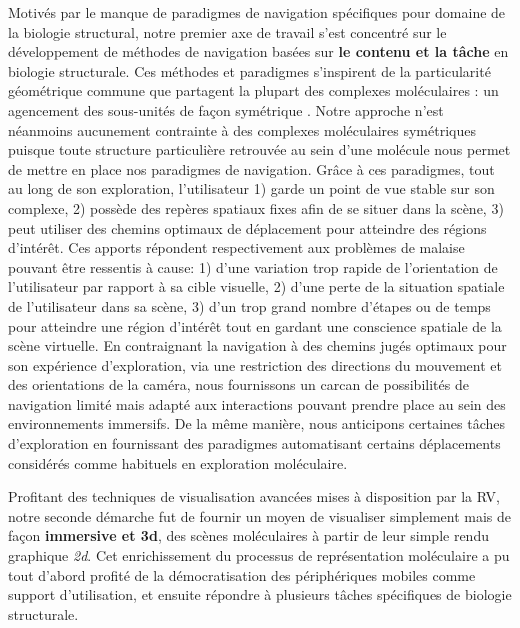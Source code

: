 Motivés par le manque de paradigmes de navigation spécifiques pour domaine de la biologie structural, notre premier axe de travail s'est concentré sur le développement de méthodes de navigation basées sur \textbf{le contenu et la tâche} en biologie structurale. Ces méthodes et paradigmes s'inspirent de la particularité géométrique commune que partagent la plupart des complexes moléculaires : un agencement des sous-unités de façon symétrique \cite{goodsell_structural_2000}. Notre approche n'est néanmoins aucunement contrainte à des complexes moléculaires symétriques puisque toute structure particulière retrouvée au sein d'une molécule nous permet de mettre en place nos paradigmes de navigation. Grâce à ces paradigmes, tout au long de son exploration, l'utilisateur 1) garde un point de vue stable sur son complexe, 2) possède des repères spatiaux fixes afin de se situer dans la scène, 3) peut utiliser des chemins optimaux de déplacement pour atteindre des régions d’intérêt. Ces apports répondent respectivement aux problèmes de malaise pouvant être ressentis à cause: 1) d'une variation trop rapide de l'orientation de l'utilisateur par rapport à sa cible visuelle, 2) d'une perte de la situation spatiale de l'utilisateur dans sa scène, 3) d'un trop grand nombre d'étapes ou de temps pour atteindre une région d'intérêt tout en gardant une conscience spatiale de la scène virtuelle. En contraignant la navigation à des chemins jugés optimaux pour son expérience d'exploration, via une restriction des directions du mouvement et des orientations de la caméra, nous fournissons un carcan de possibilités de navigation limité mais adapté aux interactions pouvant prendre place au sein des environnements immersifs. De la même manière, nous anticipons certaines tâches d'exploration en fournissant des paradigmes automatisant certains déplacements considérés comme habituels en exploration moléculaire.


Profitant des techniques de visualisation avancées mises à disposition par la RV, notre seconde démarche fut de fournir un moyen de visualiser simplement mais de façon \textbf{immersive et 3d}, des scènes moléculaires à partir de leur simple rendu graphique \textit{2d}. Cet enrichissement du processus de représentation moléculaire a pu tout d'abord profité de la démocratisation des périphériques mobiles comme support d'utilisation, et ensuite répondre à plusieurs tâches spécifiques de biologie structurale.


